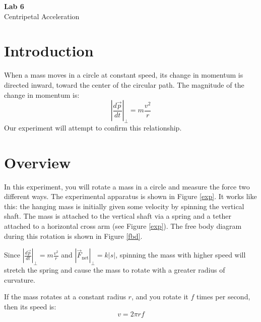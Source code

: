 \documentclass{article}
\begin{document}
\fancyfoot[C]{\thepage}
\vspace*{0cm}
\begin{center}
	{\LARGE \textbf{Lab 6}}\\
	\vspace{.25cm}
	{\Large Centripetal Acceleration}
\end{center}

\section*{Introduction}
When a mass moves in a circle at constant speed, its change in momentum is directed inward, toward the center of the circular path. The magnitude of the change in momentum is:
\begin{equation}
	\left|\frac{d\vec{p}}{dt}\right|_\perp=m\frac{v^2}{r}
\end{equation}
Our experiment will attempt to confirm this relationship.

\section*{Overview}
In this experiment, you will rotate a mass in a circle and measure the force two different ways. The experimental apparatus is shown in Figure \ref{exp}. It works like this: the hanging mass is initially given some velocity by spinning the vertical shaft. The mass is attached to the vertical shaft via a spring and a tether attached to a horizontal cross arm (see Figure \ref{exp}). The free body diagram during this rotation is shown in Figure \ref{fbd}.

Since $\left|\frac{d\vec{p}}{dt}\right|_\perp=m\frac{v^2}{r}$ and $|\vec{F}_\mathrm{net}|_\perp=k|s|$, spinning the mass with higher speed will stretch the spring and cause the mass to rotate with a greater radius of curvature.

If the mass rotates at a constant radius $r$, and you rotate it $f$ times per second, then its speed is:
\begin{equation}
	v=2\pi rf
\end{equation}
\end{document}
